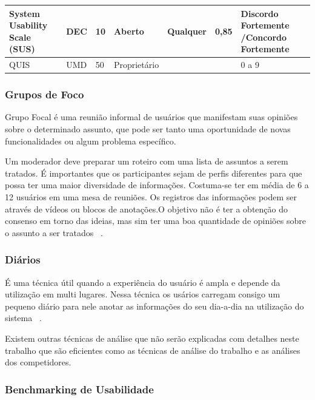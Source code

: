 \begin{table}[h]
\begin{tabular}{|p{3cm}|l|l|l|p{3cm}|l|l|}
System Usability Scale (SUS)                                                                 & DEC              & 10       & Aberto          & Qualquer              & 0,85           & Discordo Fortemente /Concordo Fortemente                                            \\ \hline
QUIS                                                                                         & UMD              & 50       & Proprietário    &                       &                & 0 a 9                                                                               \\ \hline
\end{tabular}
\end{table}


\subsubsection{Grupos de Foco}

	Grupo Focal é uma reunião informal de usuários que manifestam suas opiniões sobre o determinado assunto, que pode ser tanto uma oportunidade de novas funcionalidades ou algum problema específico.

	Um moderador deve preparar um roteiro  com uma lista de assuntos a serem tratados. É importantes que os participantes sejam de perfis diferentes para que possa ter uma maior diversidade de informações. Costuma-se ter em média de 6 a 12 usuários em uma mesa de reuniões. Os registros das informações podem ser através de vídeos ou blocos de anotações.O objetivo não é ter a obtenção do consenso em torno das ideias, mas sim ter uma boa quantidade de opiniões sobre o assunto a ser tratados ~\cite{cybis2010}.


\subsubsection{Diários}

	É uma técnica útil quando a experiência do usuário é ampla e depende da utilização em multi lugares. Nessa técnica os usários carregam consigo um pequeno diário para nele anotar as informações do seu dia-a-dia na utilização do sistema ~\cite{cybis2010}.

	Existem outras técnicas de análise que não serão explicadas com detalhes neste trabalho que são eficientes como as técnicas de análise do trabalho e as análises dos competidores.

\subsubsection{Benchmarking de Usabilidade}

